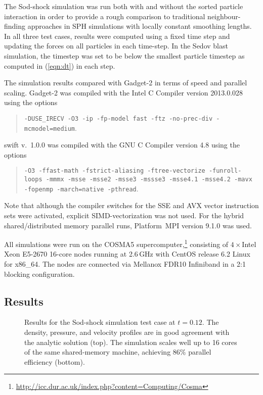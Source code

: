 \documentclass[final]{siamltex}
\newcommand{\eqn}[1]
    {(\ref{eqn:#1})}
\newcommand{\swift}
    {{\sc swift}\xspace}
\begin{document}
The Sod-shock simulation was run both with and without the
sorted particle interaction in order to provide a rough comparison
to traditional neighbour-finding approaches in SPH simulations with
locally constant smoothing lengths.
In all three test cases, results were
computed using a fixed time step and updating the forces on all
particles in each time-step.
In the Sedov blast simulation, the timestep was set to be below
the smallest particle timestep as computed in \eqn{dt}
in each step.

The simulation results compared with Gadget-2 \cite{ref:Springel2005}
in terms of  speed and parallel scaling.
Gadget-2 was compiled with the Intel C Compiler version 2013.0.028
using the options 
\begin{quote}{\tt -DUSE\_IRECV -O3 -ip -fp-model fast -ftz
-no-prec-div -mcmodel=medium}.\end{quote}
\swift v.~1.0.0 was compiled with the GNU C Compiler version 4.8
using the options
\begin{quote}{\tt -O3 -ffast-math -fstrict-aliasing
-ftree-vectorize -funroll-loops -mmmx -msse -msse2 -msse3 -mssse3
-msse4.1 -msse4.2 -mavx -fopenmp -march=native -pthread}.\end{quote}
Note that although the compiler switches for the SSE and AVX
vector instruction sets were activated, explicit
SIMD-vectorization was not used.
For the hybrid shared/distributed memory parallel runs,
Platform~MPI version 9.1.0 was used.

All simulations were run on the COSMA5 supercomputer,\footnote{\url{http://icc.dur.ac.uk/index.php?content=Computing/Cosma}}
consisting of $4\times$Intel Xeon E5-2670
16-core nodes running at 2.6\,GHz with CentOS release 6.2 Linux
for x86\_64.
The nodes are connected
via Mellanox FDR10 Infiniband in a 2:1 blocking configuration.


\subsection{Results}

\begin{figure}
    \centerline{}%
    \caption{Results for the Sod-shock simulation test case at $t=0.12$.
        The density,
        pressure, and velocity profiles are in good agreement with the
        analytic solution (top).
        The simulation scales well up to 16 cores of the same shared-memory
        machine, achieving 86\% parallel efficiency (bottom).}
    \label{fig:SodShock}
\end{figure}
\end{document}
